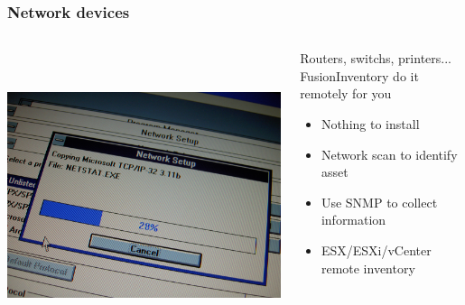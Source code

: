 \documentclass{beamer}
\begin{document}
\begin{frame}

    \frametitle{Network devices}


 \begin{columns}
 \begin{column}{0.15\textwidth}
         \includegraphics[height=8.5cm]{./pics/networking.jpg}
 \end{column}
 \begin{column}{1.25\textwidth}


    \begin{block}{Routers, switchs, printers... \\
    FusionInventory do it remotely for you}
        \begin{itemize}
            \item Nothing to install
            \item Network scan to identify asset
            \item Use SNMP to collect information
            \item ESX/ESXi/vCenter remote inventory
        \end{itemize}
    \end{block}

 \end{column}
\end{columns}
\end{frame}
\end{document}
